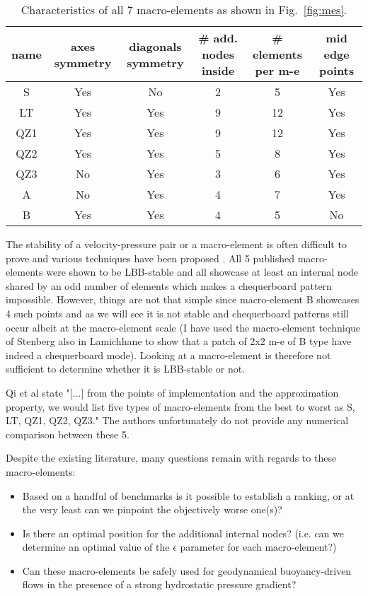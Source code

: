 \documentclass[a4paper]{article}
\begin{document}
\begin{table}[h!]
\centering
\begin{tabular}{cccccc}
\hline
{name} & {axes symmetry}  & {diagonals symmetry} & {\# add. nodes inside} 
& {\# elements per m-e} & {mid edge points}  \\
\hline
\hline
S   &  Yes &   No & 2  & 5 & Yes \\
LT  &  Yes &  Yes & 9 & 12 & Yes \\
QZ1 &  Yes &  Yes & 9 & 12 & Yes \\
QZ2 &  Yes &  Yes & 5 & 8  & Yes \\
QZ3 &  No  &  Yes & 3 & 6  & Yes \\
A   &  No  &  Yes & 4 & 7  & Yes \\
B   &  Yes &  Yes & 4 & 5  & No  \\
\hline
\end{tabular}
\caption{Characteristics of all 7 macro-elements as shown in Fig.~\ref{fig:mes}.\label{tab1}}%
\end{table}


The stability of a velocity-pressure pair or a macro-element is often difficult to prove 
and various techniques have been proposed \cite{bobf13}. 
All 5 published macro-elements were shown to be LBB-stable and all showcase at least 
an internal node shared by an odd number of elements which makes a chequerboard pattern impossible. 
However, things are not that simple since macro-element B showcases 
4 such points and as we will see it is not stable and chequerboard patterns still occur 
albeit at the macro-element scale (I have used the macro-element technique of Stenberg 
also in Lamichhane to show that a patch of 2x2 m-e of B type have indeed a chequerboard mode).
Looking at a macro-element is therefore not sufficient to determine whether it is LBB-stable or not. 

Qi et al \cite{qizh07} state "[...] from the points of implementation and the approximation property, we 
would list five types of macro-elements from the best to worst as S, LT, QZ1, QZ2, QZ3." 
The authors unfortunately do not provide any numerical comparison between these 5. 

Despite the existing literature, many questions remain with regards to these macro-elements:
\begin{itemize}
\item Based on a handful of benchmarks is it possible to establish a ranking, or at the very least can we pinpoint the objectively worse one(s)?

\item Is there an optimal position for the additional internal nodes? (i.e. can we determine an optimal value of the 
$\epsilon$ parameter for each macro-element?)

\item Can these macro-elements be safely used for geodynamical 
buoyancy-driven flows in the presence of a strong hydrostatic pressure gradient?
\end{itemize}
\end{document}
